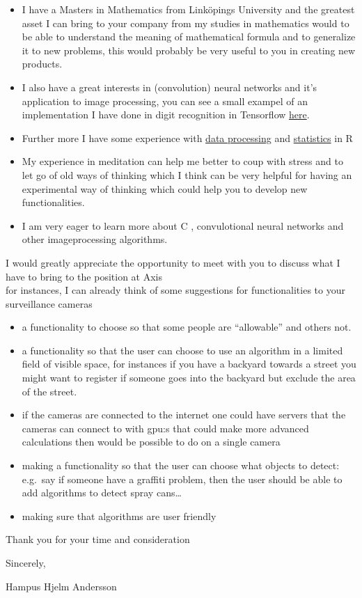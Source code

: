 \documentclass[]{article}
\providecommand{\tightlist}{%
  \setlength{\itemsep}{0pt}\setlength{\parskip}{0pt}}
\begin{document}
\begin{itemize}
\item
  I have a Masters in Mathematics from Linköpings University and the
  greatest asset I can bring to your company from my studies in
  mathematics would to be able to understand the meaning of mathematical
  formula and to generalize it to new problems, this would probably be
  very useful to you in creating new products.
\item
  I also have a great interests in (convolution) neural networks and
  it's application to image processing, you can see a small exampel of
  an implementation I have done in digit recognition in Tensorflow
  \href{https://github.com/HHA123/Job/blob/master/TensorflowNNdigit.ipynb}{here}.
\item
  Further more I have some experience with
  \href{https://github.com/HHA123/Job/blob/master/RepRes2.html}{data
  processing} and
  \href{https://github.com/HHA123/Job/blob/master/Statinf2.Rmd}{statistics}
  in R
\item
  My experience in meditation can help me better to coup with stress and
  to let go of old ways of thinking which I think can be very helpful
  for having an experimental way of thinking which could help you to
  develop new functionalities.
\item
  I am very eager to learn more about C , convulotional neural networks
  and other imageprocessing algorithms.
\end{itemize}

I would greatly appreciate the opportunity to meet with you to discuss
what I have to bring to the position at Axis\\
for instances, I can already think of some suggestions for
functionalities to your surveillance cameras\\

\begin{itemize}
\tightlist
\item
  a functionality to choose so that some people are ``allowable'' and
  others not.
\item
  a functionality so that the user can choose to use an algorithm in a
  limited field of visible space, for instances if you have a backyard
  towards a street you might want to register if someone goes into the
  backyard but exclude the area of the street.
\item
  if the cameras are connected to the internet one could have servers
  that the cameras can connect to with gpu:s that could make more
  advanced calculations then would be possible to do on a single camera
\item
  making a functionality so that the user can choose what objects to
  detect: e.g.~say if someone have a graffiti problem, then the user
  should be able to add algorithms to detect spray cans\ldots{}
\item
  making sure that algorithms are user friendly
\end{itemize}

Thank you for your time and consideration

Sincerely,

Hampus Hjelm Andersson
\end{document}

